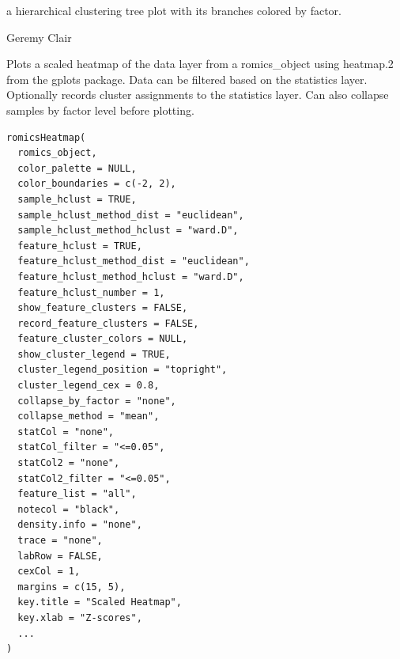 \documentclass[a4paper]{book}
\begin{document}
%
\begin{Value}
a hierarchical clustering tree plot with its branches colored by factor.
\end{Value}
%
\begin{Author}
Geremy Clair
\end{Author}
%
\begin{Description}
Plots a scaled heatmap of the data layer from a romics\_object using heatmap.2 from the gplots package. Data can be filtered based on the statistics layer. Optionally records cluster assignments to the statistics layer. Can also collapse samples by factor level before plotting.
\end{Description}
%
\begin{Usage}
\begin{verbatim}
romicsHeatmap(
  romics_object,
  color_palette = NULL,
  color_boundaries = c(-2, 2),
  sample_hclust = TRUE,
  sample_hclust_method_dist = "euclidean",
  sample_hclust_method_hclust = "ward.D",
  feature_hclust = TRUE,
  feature_hclust_method_dist = "euclidean",
  feature_hclust_method_hclust = "ward.D",
  feature_hclust_number = 1,
  show_feature_clusters = FALSE,
  record_feature_clusters = FALSE,
  feature_cluster_colors = NULL,
  show_cluster_legend = TRUE,
  cluster_legend_position = "topright",
  cluster_legend_cex = 0.8,
  collapse_by_factor = "none",
  collapse_method = "mean",
  statCol = "none",
  statCol_filter = "<=0.05",
  statCol2 = "none",
  statCol2_filter = "<=0.05",
  feature_list = "all",
  notecol = "black",
  density.info = "none",
  trace = "none",
  labRow = FALSE,
  cexCol = 1,
  margins = c(15, 5),
  key.title = "Scaled Heatmap",
  key.xlab = "Z-scores",
  ...
)
\end{verbatim}
\end{Usage}
%
\end{document}
